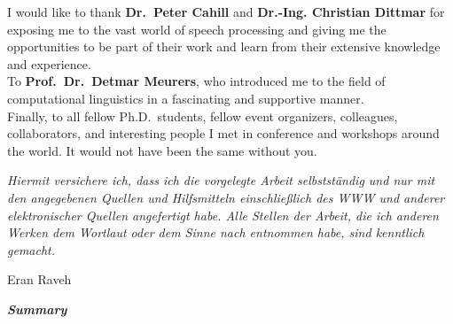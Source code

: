 \begin{center}
	I would like to thank \textbf{Dr.\ Peter Cahill} and \textbf{Dr.-Ing. Christian Dittmar} for exposing me to the vast world of speech processing and giving me the opportunities to be part of their work and learn from their extensive knowledge and experience.\\[0.8cm]
	
	To \textbf{Prof.\ Dr.\ Detmar Meurers}, who introduced me to the field of computational linguistics in a fascinating and supportive manner.\\[0.8cm]
	
	Finally, to all fellow Ph.D.\ students, fellow event organizers, colleagues, collaborators, and interesting people I met in conference and workshops around the world.
	It would not have been the same without you.\\[0.8cm]
\end{center}
\newpage


\mbox{}
\newpage
\begin{multicols}{2}
    \vspace*{\textheight}
    \columnbreak
    \vspace*{3cm}
	    \Large{\textit{Hiermit versichere ich, dass ich die vorgelegte Arbeit selbstst{\"a}ndig und nur mit den angegebenen Quellen und Hilfsmitteln einschließlich des WWW und anderer elektronischer Quellen angefertigt habe.
        Alle Stellen der Arbeit, die ich anderen Werken dem Wortlaut oder dem Sinne nach entnommen habe, sind kenntlich gemacht.}}
    \vspace{0.55cm}
    \begin{flushright}
		{Eran Raveh}
    \end{flushright}
\end{multicols}
\clearpage

\pagestyle{fancyplain}
\fancyhead{} %
\renewcommand{\headrulewidth}{0pt} %
\cfoot{} %
\fancyfoot[LO,RE]{\thepage} %

\begin{center}
	\textit{\textbf{\Huge Summary}}\\[1cm]
\end{center}

\clearpage

